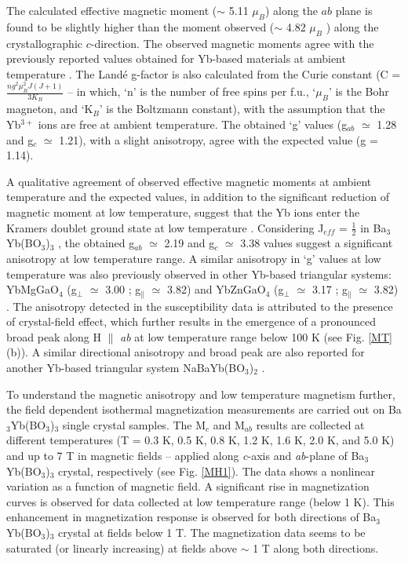 \documentclass[aps,prl,reprint,showpacs,showkeys,superscriptaddress,floatfix,twocolumn]{revtex4-2}
\newcommand{\bybo}{Ba$_3$Yb(BO$_3$)$_3$}
\begin{document}
The calculated effective magnetic moment ($\sim$ 5.11 $\mu_{B}$) along the $ab$ plane is found to be slightly higher than the moment observed ($\sim$ 4.82 $\mu_{B}$ ) along the crystallographic $c$-direction. The observed magnetic moments agree with the previously reported values obtained for Yb-based materials at ambient temperature \cite{BlotePhysica1969, CaoJPCM2009, SandersJPCM2017}. The Land\'e g-factor is also calculated from the Curie constant (C = $\frac{ng^2\mu_{B}^2J(J+1)} {3K_B}$ -- in which, `n' is the number of free spins per f.u., `$\mu_B$' is the Bohr magneton, and `K$_B$' is the Boltzmann constant), with the assumption that the Yb$^{3+}$ ions are free at ambient temperature. The obtained `g' values (g$_{ab}$ $\simeq$ 1.28 and g$_c$ $\simeq$ 1.21), with a slight anisotropy, agree with the expected value (g = 1.14).

A qualitative agreement of observed effective magnetic moments at ambient temperature and the expected values, in addition to the significant reduction of magnetic moment at low temperature, suggest that the Yb ions enter the Kramers doublet ground state at low temperature \cite{BlotePhysica1969, CaoJPCM2009, CavaPRM2019}. Considering  J$_{eff}$ = $\frac{1}{2}$ in \bybo{} \cite{ZengPRB2019}, the obtained g$_{ab}$ $\simeq$ 2.19 and g$_c$ $\simeq$ 3.38 values suggest a significant anisotropy at low temperature range. A similar anisotropy in `g' values at low temperature was also previously observed in other Yb-based triangular systems: YbMgGaO$_4$ (g$_{\perp}$ $\simeq$ 3.00 ; g$_{\parallel}$ $\simeq$ 3.82) and YbZnGaO$_4$ (g$_{\perp}$ $\simeq$ 3.17 ; g$_{\parallel}$ $\simeq$ 3.82) \cite{MaPRL2018}. The anisotropy detected in the susceptibility data is attributed to the presence of crystal-field effect, which further results in the emergence of a pronounced broad peak along H $\parallel$ \textit{ab} at low temperature range below 100 K (see Fig. \ref{MT}(b)). A similar directional anisotropy and broad peak are also reported for another Yb-based triangular system NaBaYb(BO$_3$)$_2$ \cite{CavaPRM2019}.

To understand the magnetic anisotropy and low temperature magnetism further, the field dependent isothermal magnetization measurements are carried out on \bybo{} single crystal samples. The M$_c$ and M$_{ab}$ results are collected at different temperatures (T = 0.3 K, 0.5 K, 0.8 K, 1.2 K, 1.6 K, 2.0 K, and 5.0 K) and up to 7 T in magnetic fields -- applied along \textit{c}-axis and \textit{ab}-plane of \bybo{} crystal, respectively (see Fig. \ref{MH1}). The data shows a nonlinear variation as a function of magnetic field. A significant rise in magnetization curves is observed for data collected at low temperature range (below 1 K). This enhancement in magnetization response is observed for both directions of \bybo{} crystal at fields below 1 T. The magnetization data seems to be saturated (or linearly increasing) at fields above $\sim$ 1 T along both directions. 
\end{document}
